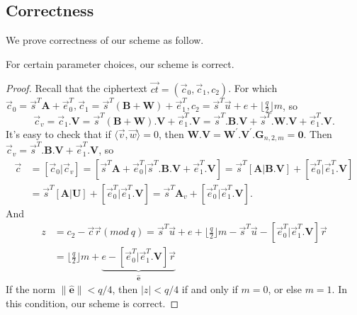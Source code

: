 \subsection{Correctness}
We prove correctness of our scheme as follow.
\begin{lemma} 
For certain parameter choices, our scheme is correct.
\end{lemma}
\begin{proof}
 Recall that the ciphertext $\vec{ct}=(\vec{c}_{0},\vec{c}_{1},c_{2})$. For which $\vec{c}_{0}=\vec{s}^{T}\textbf{A}+\vec{e}^{T}_{0},  \vec{c}_{1}=\vec{s}^{T}(\textbf{B}+\textbf{W})+\vec{e}^{T}_{1}, c_{2}=\vec{s}^{T}\vec{u}+e+\lfloor \frac{q}{2} \rfloor m$, so
\begin{equation}
\vec{c}_{v}=\vec{c}_{1}.\textbf{V}=\vec{s}^{T}(\textbf{B}+\textbf{W}).\textbf{V}+\vec{e}^{T}_{1}.\textbf{V}=\vec{s}^{T}.\textbf{B}.\textbf{V}+\vec{s}^{T}.\textbf{W}.\textbf{V}+
\vec{e}^{T}_{1}.\textbf{V}.
\end{equation}
It's easy to check that if $\langle \vec{v},\vec{w} \rangle=0$, then $\textbf{W}.\textbf{V}=\textbf{W}^{'}.\textbf{V}^{'}.\textbf{G}_{n,2,m}=\textbf{0}$. Then $\vec{c}_{v}=\vec{s}^{T}.\textbf{B}.\textbf{V}+\vec{e}^{T}_{1}.\textbf{V}$, so
\begin{equation}
\begin{aligned}
\vec{c}&=[\vec{c}_{0}|\vec{c}_{v}]=[\vec{s}^{T}\textbf{A}+\vec{e}^{T}_{0}|\vec{s}^{T}.\textbf{B}.\textbf{V}+\vec{e}^{T}_{1}.\textbf{V}]=\vec{s}^{T}[\textbf{A}|\textbf{B}.\textbf{V}]+[\vec{e}^{T}_{0}|\vec{e}^{T}_{1}.\textbf{V}]\\
&=\vec{s}^{T}[\textbf{A}|\textbf{U}]+[\vec{e}^{T}_{0}|\vec{e}^{T}_{1}.\textbf{V}]=\vec{s}^{T}\textbf{A}_{v}+[\vec{e}^{T}_{0}|\vec{e}^{T}_{1}.\textbf{V}].
\end{aligned}
\end{equation}
And
\begin{equation}
\begin{aligned}
z&=c_{2}-\vec{c}\vec{r}(mod\ q)=\vec{s}^{T}\vec{u}+e+\lfloor \frac{q}{2} \rfloor m-\vec{s}^{T}\vec{u}-[\vec{e}^{T}_{0}|\vec{e}^{T}_{1}.\textbf{V}]\vec{r}\\
&=\lfloor \frac{q}{2} \rfloor m+\underbrace{e-[\vec{e}^{T}_{0}|\vec{e}^{T}_{1}.\textbf{V}]\vec{r}}_{\hat{\textbf{e}}}
\end{aligned}
\end{equation}
If the norm $\|\hat{\textbf{e}}\|< q/4$, then $|z|< q/4$ if and only if $m=0$, or else $m=1$. In this condition, our scheme is correct.
\end{proof}